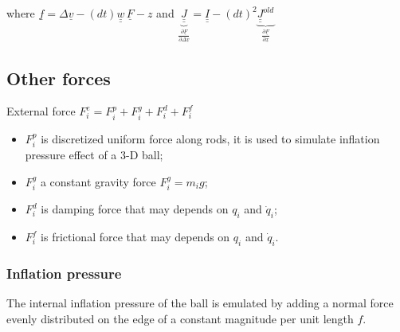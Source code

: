 \documentclass[letterpaper,9pt,twocolumn]{extarticle}
\begin{document}
			where $\underline f = \Delta \underline v - (dt)\underline{\underline w}\,\underline F - z$ and $\underbrace{\underline{\underline J}}_{\frac{\partial \underline F}{\partial \Delta \underline v}} = \underline{\underline I} - (dt)^2\underbrace{\underline{\underline J}^{old}}_{\frac{\partial \underline F}{\partial \underline x}}$
	\subsection{Other forces}
		External force $F_i^e = F_i^p + F_i^g + F_i^d + F_i^f$
		\begin{itemize}
			\item $F_i^p$ is discretized uniform force along rods, it is used to simulate inflation pressure effect of a 3-D ball;
			\item $F_i^g$ a constant gravity force $F_i^g = m_ig$;
			\item $F_i^d$ is damping force that may depends on $q_i$ and $\dot q_i$;
			\item $F_i^f$ is frictional force that may depends on $q_i$ and $\dot q_i$.
		\end{itemize}
		\subsubsection{Inflation pressure}
			The internal inflation pressure of the ball is emulated by adding a normal force evenly distributed on the edge of a constant magnitude per unit length $f$.
			
\end{document}
